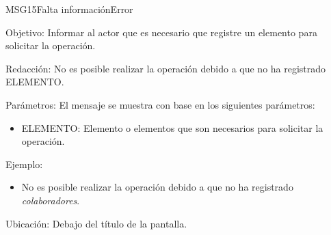 \begin{mensaje}{MSG15}{Falta información}{Error}
	\item [Objetivo:] Informar al actor que es necesario que registre un elemento para solicitar la operación.
	\item[Redacción:] No es posible realizar la operación debido a que no ha registrado ELEMENTO.
	\item[Parámetros:] El mensaje se muestra con base en los siguientes parámetros:
	\begin{itemize}
		\item ELEMENTO: Elemento o elementos que son necesarios para solicitar la operación.
	\end{itemize}
	\item[Ejemplo:] \begin{itemize}
		\item No es posible realizar la operación debido a que no ha registrado {\em colaboradores}.
	\end{itemize}
	\item [Ubicación:] Debajo del título de la pantalla.
\end{mensaje}